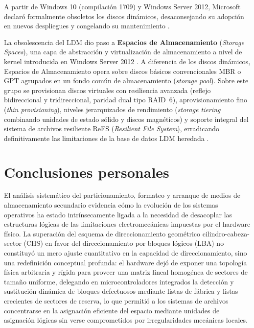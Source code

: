 \documentclass[12pt]{article}
\begin{document}
A partir de Windows 10 (compilación 1709) y Windows Server 2012, Microsoft declaró formalmente obsoletos los discos dinámicos, desaconsejando su adopción en nuevos despliegues y congelando su mantenimiento \parencite{microsoft2024basicdynamic}.

La obsolescencia del LDM dio paso a \textbf{Espacios de Almacenamiento} (\textit{Storage Spaces}), una capa de abstracción y virtualización de almacenamiento a nivel de kernel introducida en Windows Server 2012 \parencite{microsoft2024storagespaces}. A diferencia de los discos dinámicos, Espacios de Almacenamiento opera sobre discos básicos convencionales MBR o GPT agrupados en un fondo común de almacenamiento (\textit{storage pool}). Sobre este grupo se provisionan discos virtuales con resiliencia avanzada (reflejo bidireccional y tridireccional, paridad dual tipo RAID~6), aprovisionamiento fino (\textit{thin provisioning}), niveles jerarquizados de rendimiento (\textit{storage tiering} combinando unidades de estado sólido y discos magnéticos) y soporte integral del sistema de archivos resiliente ReFS (\textit{Resilient File System}), erradicando definitivamente las limitaciones de la base de datos LDM heredada \parencite{microsoft2024storagespaces}.

\section{Conclusiones personales}
\label{sec:conclusionesPersonales}

El análisis sistemático del particionamiento, formateo y arranque de medios de almacenamiento secundario evidencia cómo la evolución de los sistemas operativos ha estado intrínsecamente ligada a la necesidad de desacoplar las estructuras lógicas de las limitaciones electromecánicas impuestas por el hardware físico. La superación del esquema de direccionamiento geométrico cilindro-cabeza-sector (CHS) en favor del direccionamiento por bloques lógicos (LBA) no constituyó un mero ajuste cuantitativo en la capacidad de direccionamiento, sino una redefinición conceptual profunda: el hardware dejó de exponer una topología física arbitraria y rígida para proveer una matriz lineal homogénea de sectores de tamaño uniforme, delegando en microcontroladores integrados la detección y sustitución dinámica de bloques defectuosos mediante listas de fábrica y listas crecientes de sectores de reserva, lo que permitió a los sistemas de archivos concentrarse en la asignación eficiente del espacio mediante unidades de asignación lógicas sin verse comprometidos por irregularidades mecánicas locales.
\end{document}
